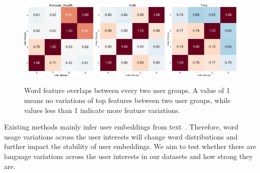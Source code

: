 \begin{figure}[t]
    \centering
    \includegraphics[width=0.325\textwidth]{./images/chapter4/uembedding/amazon_health_word.pdf}
    \includegraphics[width=0.325\textwidth]{./images/chapter4/uembedding/imdb_word.pdf}
    \includegraphics[width=0.325\textwidth]{./images/chapter4/uembedding/yelp_word.pdf}
    \caption{Word feature overlaps between every two user groups. A value of 1 means no variations of top features between two user groups, while values less than 1 indicate more feature variations.}
    \label{chap4:fig:word_user}
\end{figure}


Existing methods mainly infer user embeddings from text~\cite{pan2019social}.
Therefore, word usage variations across the user interests will change word distributions and further impact the stability of user embeddings.
We aim to test whether there are language variations across the user interests in our datasets and how strong they are.

